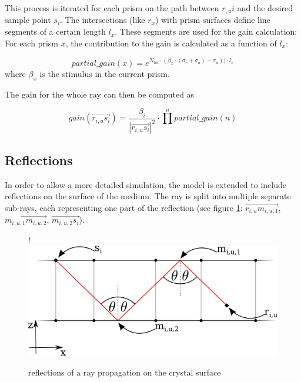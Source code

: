 This process is iterated for each prism on the path between $r_{,u}i$ and the
desired sample point $s_i$. The intersections (like $r_x$) with prism surfaces
define line segments of a certain length $l_x$. These segments are used for the
gain calculation: For each prism $x$, the contribution to the gain is calculated
as a function of $l_x$:

\begin{equation}
\label{eq:partial_gain}
  partial\_gain(x) = 
  e^{N_{tot} \cdot (\beta_x \cdot (\sigma_e + \sigma_a) - \sigma_a)) \cdot l_x}
\end{equation}
where $\beta_x$ is the stimulus in the current
prism.

The gain for the whole ray can then be computed as

\begin{equation}
\label{eq:gain}
  gain(\overrightarrow{r_{i,u}s_i}) =  
  \frac{\beta_i}{ |\overrightarrow{r_{i,u}s_i}|^2} \cdot \prod^npartial\_gain(n) 
\end{equation}



\subsection{Reflections}
\label{subsec:reflections}

In order to allow a more detailed simulation, the model is extended to include
reflections on the surface of the medium. The ray is split into multiple
separate sub-rays, each representing one part of the reflection (see figure
\ref{graphic:reflections_2D}: $\overrightarrow{r_{i,u}m_{i,u,1}}$,
$\overrightarrow{m_{i,u,1}m_{i,u,2}}$, $\overrightarrow{m_{i,u,2}s_i}$).


\begin{figure}[H]
  \centerline{
     {!} {\includegraphics{./graphics/reflections_1.png}}
  }
  \caption{reflections of a ray propagation on the crystal surface}
  \label{graphic:reflections_2D}
\end{figure}


